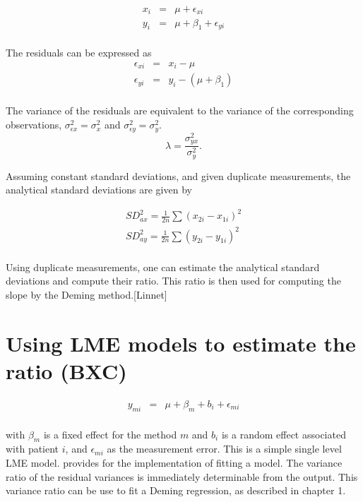 \documentclass[12pt, a4paper]{report}
\theoremstyle{plain}
\theoremstyle{definition}
\theoremstyle{remark}
\begin{document}
\begin{eqnarray*}
	x_{i} &=& \mu + \epsilon_{xi}\\
	y_{i} &=& \mu +  \beta_{1} + \epsilon_{yi}\\
\end{eqnarray*}

The residuals can be expressed as
\begin{eqnarray*}
	\epsilon_{xi} &=& x_{i} - \mu  \\
	\epsilon_{yi} &=& y_{i} - (\mu + \beta_{1}) \\
\end{eqnarray*}

The variance of the residuals are equivalent to the variance of the corresponding observations, $\sigma^{2}_{\epsilon x} =
\sigma^{2}_{x}$ and $\sigma^{2}_{\epsilon y} = \sigma^{2}_{y}$.
\begin{equation}
\lambda = \frac{\sigma^{2}_{yx}}{\sigma^{2}_{y}}.
\end{equation}

Assuming constant standard deviations, and given duplicate measurements, the analytical standard deviations are given by

\begin{eqnarray*}
	SD^{2}_{ax} = \frac{1}{2n} \sum (x_{2i} - x_{1i})^{2}\\
	SD^{2}_{ay} = \frac{1}{2n} \sum (y_{2i} - y_{1i})^{2}\\
\end{eqnarray*}

Using duplicate measurements, one can estimate the analytical
standard deviations and compute their ratio. This ratio is then
used for computing the slope by the Deming method.[Linnet]



\section{Using LME models to estimate the ratio (BXC) }

\begin{eqnarray*}
	y_{mi} &=& \mu + \beta_{m} + b_{i} + \epsilon_{mi}\\
\end{eqnarray*}

with $\beta_{m}$ is a fixed effect for the method $m$ and $b_{i}$ is a random effect associated with patient $i$, and
$\epsilon_{mi}$ as the measurement error. This is a simple single level LME model. \citet{pb} provides for the implementation of fitting a model. The variance ratio of the residual variances is immediately determinable from the output. This variance ratio can be use to fit a Deming regression, as described in chapter 1.
\end{document}
